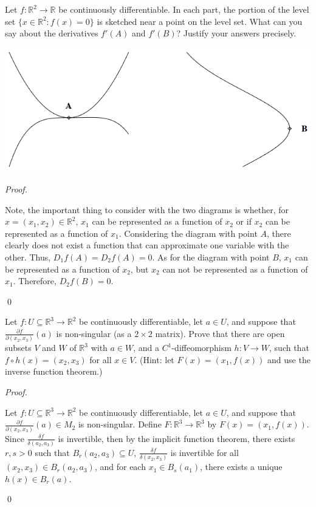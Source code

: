 \documentclass[12pt]{article}
\newenvironment{problem}[2][Problem]{\begin{trivlist}
\item[\hskip \labelsep {\bfseries #1}\hskip \labelsep {\bfseries
#2.}]}{\end{trivlist}}
\newenvironment{sol}
    {\emph{Proof.}
    }
    {
    \qed
    }
\begin{document}
  
  \begin{problem}{27}
  Let $f : \mathbb{R}^2 \to \mathbb{R}$ be continuously differentiable. In each part, the portion of the level set $\{x \in \mathbb{R}^2 : f(x) = 0\}$ is sketched near a point on the level set. What can you say about the derivatives $f'(A)$ and $f'(B)$? Justify your answers precisely.
  
  \begin{center}
      \includegraphics[scale=1]{473figure.PNG}
      \end{center}
      
      \begin{sol}
      Note, the important thing to consider with the two diagrams is whether, for $x = (x_1,x_2) \in \mathbb{R}^2$, $x_1$ can be represented as a function of $x_2$ or if $x_2$ can be represented as a function of $x_1$. Considering the diagram with point $A$, there clearly does not exist a function that can approximate one variable with the other. Thus, $D_1f(A) = D_2f(A) = 0$. As for the diagram with point $B$, $x_1$ can be represented as a function of $x_2$, but $x_2$ can not be represented as a function of $x_1$. Therefore, $D_2f(B) = 0$.
      \end{sol}
  \end{problem}
  
  
  \begin{problem}{28}
  Let $f : U \subseteq \mathbb{R}^3 \to \mathbb{R}^2$ be continuously differentiable, let $a \in U$, and suppose that $\frac{\partial f}{\partial (x_2,x_3)}(a)$ is non-singular (as a $2 \times 2$ matrix). Prove that there are open subsets $V$ and $W$ of $\mathbb{R}^3$ with $a \in W$, and a $C^1$-diffeomorphism $h : V \to W$, such that $f \circ h(x) = (x_2, x_3)$ for all $x \in V$. (Hint: let $F(x) = (x_1,f(x))$ and use the inverse function theorem.)
  \end{problem}
  
  \begin{sol}
  Let $f : U \subseteq \mathbb{R}^3 \to \mathbb{R}^2$ be continuously differentiable, let $a \in U$, and suppose that $\frac{\partial f}{\partial (x_2,x_3)}(a) \in M_2$ is non-singular. Define $F : \mathbb{R}^3 \to \mathbb{R}^3$ by $F(x) = (x_1,f(x))$. Since $\frac{\delta f}{\delta (a_2,a_3)}$ is invertible, then by the implicit function theorem, there exists $r,s > 0$ such that $B_r(a_2,a_3) \subseteq U$, $\frac{\delta f}{\delta (x_2,x_3)}$ is invertible for all $(x_2,x_3) \in B_r(a_2,a_3)$, and for each $x_1 \in B_s(a_1)$, there exists a unique $h(x) \in B_r(a)$.
  \end{sol}
\end{document}

